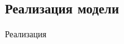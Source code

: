 \documentclass[../diploma.tex]{subfiles}
\begin{document}
\subsection{Реализация модели}

	Реализация
\end{document}
